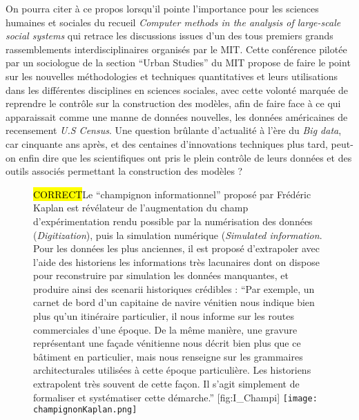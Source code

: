 On pourra citer à ce propos \textcite{Gullahorn1966} lorsqu'il pointe l'importance pour les sciences humaines et sociales du recueil \textit{Computer methods in the analysis of large-scale social systems} qui retrace les discussions issues d'un des tous premiers grands rassemblements interdisciplinaires organisés par le MIT. Cette conférence pilotée par un sociologue de la section \foreignquote{english}{Urban Studies} du MIT \autocite{Beshers1965} propose de faire le point sur les nouvelles méthodologies et techniques quantitatives et leurs utilisations dans les différentes disciplines en sciences sociales, avec cette volonté marquée de reprendre le contrôle sur la construction des modèles, afin de faire face à ce qui apparaissait comme une manne de données nouvelles, les données américaines de recensement \textit{U.S Census}. Une question brûlante d'actualité à l'ère du \textit{Big data}, car cinquante ans après, et des centaines d'innovations techniques plus tard, peut-on enfin dire que les scientifiques ont pris le plein contrôle de leurs données et des outils associés permettant la construction des modèles ?

\begin{figure}[!htbp]
\begin{sidecaption}[fortoc]{\hl{CORRECT}Le \enquote{champignon informationnel} proposé par Frédéric Kaplan est révélateur de l'augmentation du champ d'expérimentation rendu possible par la numérisation des données (\textit{Digitization}), puis la simulation numérique (\textit{Simulated information}. Pour les données les plus anciennes, il est proposé d'extrapoler avec l'aide des historiens les informations très lacunaires dont on dispose pour reconstruire par simulation les données manquantes, et produire ainsi des scenarii historiques crédibles : \enquote{Par exemple, un carnet de bord d’un capitaine de navire vénitien nous indique bien plus qu’un itinéraire particulier, il nous informe sur les routes commerciales d’une époque. De la même manière, une gravure représentant une façade vénitienne nous décrit bien plus que ce bâtiment en particulier, mais nous renseigne sur les grammaires architecturales utilisées à cette époque particulière. Les historiens extrapolent très souvent de cette façon. Il s’agit simplement de formaliser et systématiser cette démarche.} }[fig:I_Champi]
 \centering
 \texttt{[image: champignonKaplan.png]}
  \end{sidecaption}
\end{figure}

